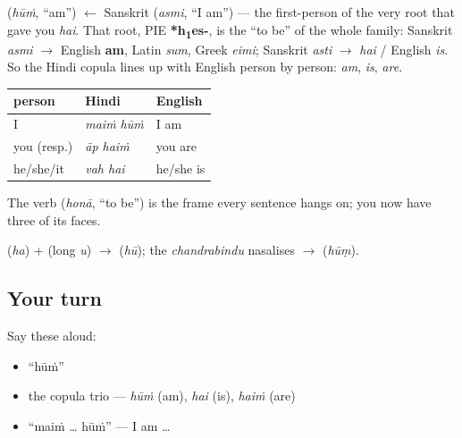 \begin{cousinweb}
\textbf{} (\emph{hūṁ}, \textquotedblleft{}am\textquotedblright{}) $\leftarrow$ Sanskrit \textbf{} (\emph{asmi}, \textquotedblleft{}I am\textquotedblright{}) — the first-person of the very root that gave you \emph{hai}. That root, PIE \textbf{*h\textsubscript{1}es-}, is the \textquotedblleft{}to be\textquotedblright{} of the whole family: Sanskrit \emph{asmi} $\to$ English \textbf{am}, Latin \emph{sum}, Greek \emph{eimi}; Sanskrit \emph{asti} $\to$ \emph{hai} / English \emph{is}. So the Hindi copula lines up with English person by person: \textbf{} \emph{am}, \textbf{} \emph{is}, \textbf{} \emph{are}.
\end{cousinweb}

\begin{grammarlens}[title={Grammar Lens: the \textquotedblleft{}to be\textquotedblright{} table so far}]
\noindent
\begin{tabularx}{\linewidth}{@{}>{\raggedright\arraybackslash}X>{\raggedright\arraybackslash}X>{\raggedright\arraybackslash}X@{}}
\toprule
\textbf{person} & \textbf{Hindi} & \textbf{English} \\
\midrule
I & \emph{maiṁ hūṁ} & I am \\
you (resp.) & \emph{āp haiṁ} & you are \\
he/she/it & \emph{vah hai} & he/she is \\
\bottomrule
\end{tabularx}

The verb \textbf{} (\emph{honā}, \textquotedblleft{}to be\textquotedblright{}) is the frame every sentence hangs on; you now have three of its faces.
\end{grammarlens}

\begin{sounds}
 (\emph{ha}) +  (long \emph{u}) $\to$  (\emph{hū}); the \emph{chandrabindu}  nasalises $\to$  (\emph{hūṃ}).
\end{sounds}

\subsection*{Your turn}
Say these aloud:

\begin{itemize}
\raggedright
  \item \textquotedblleft{}hūṁ\textquotedblright{}
  \item the copula trio — \emph{hūṁ} (am), \emph{hai} (is), \emph{haiṁ} (are)
  \item \textquotedblleft{}maiṁ … hūṁ\textquotedblright{} — I am …
\end{itemize}

